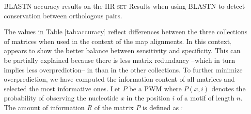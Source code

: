 \begin{table}[t!]
\begin{center}
\begin{minipage}{0.95\linewidth}\setlength{\parindent}{0pt}
\begin{center}
\end{center}
\end{minipage}
          {BLASTN accuracy results on the \textsc{HR set}}%
          {Results when using BLASTN to detect 
           conservation between orthologous pairs.}%
          {}
\end{center}
\end{table}

The values in Table \ref{tab:accuracy} reflect differences between the three
collections of matrices when used in the context of the map
alignments. In this context,  appears to show the better balance
between sensitivity and specificity. This can be partially explained 
because there is less matrix redundancy --which in turn implies less
overprediction-- in  than in the other collections. To further 
minimize overprediction, we have computed the information content of 
all  matrices and selected the most informative ones. Let $P$ be 
a PWM where $P(x,i)$ denotes the probability of observing the  
nucleotide $x$ in the position $i$ of a motif of length $n$. The amount
of information $R$ of the matrix $P$ is defined as \citet{schneider:1990a}:

